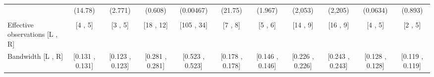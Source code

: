 \begin{tabular}{lcccccccccc}
      & (14.78) & (2.771) & (0.608) & (0.00467) & (21.75) & (1.967) & (2,053) & (2,205) & (0.0634) & (0.893) \\
      &       &       &       &       &       &       &       &       &       &  \\
\midrule
Effective observations [L , R] & [4 , 5] & [3 , 5] & [18 , 12] & [105 , 34] & [7 , 8] & [5 , 6] & [14 , 9] & [16 , 9] & [4 , 5] & [2 , 5] \\
Bandwidth [L , R] & [0.131 , 0.131] & [0.123 , 0.123] & [0.281 , 0.281] & [0.523 , 0.523] & [0.178 , 0.178] & [0.146 , 0.146] & [0.226 , 0.226] & [0.243 , 0.243] & [0.128 , 0.128] & [0.119 , 0.119] \\
\bottomrule
\bottomrule
\end{tabular}%
